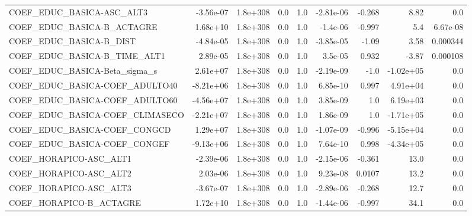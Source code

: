 \begin{tabular}{lrrrrrrrr}
COEF\_EDUC\_BASICA-ASC\_ALT3         &   -3.56e-07 &     1.8e+308 &     0.0 &      1.0 &  -2.81e-06 &      -0.268 &         8.82 &           0.0 \\
COEF\_EDUC\_BASICA-B\_ACTAGRE        &    1.68e+10 &     1.8e+308 &     0.0 &      1.0 &   -1.4e-06 &      -0.997 &          5.4 &      6.67e-08 \\
COEF\_EDUC\_BASICA-B\_DIST           &   -4.84e-05 &     1.8e+308 &     0.0 &      1.0 &  -3.85e-05 &       -1.09 &         3.58 &      0.000344 \\
COEF\_EDUC\_BASICA-B\_TIME\_ALT1      &    2.89e-05 &     1.8e+308 &     0.0 &      1.0 &    3.5e-05 &       0.932 &        -3.87 &      0.000108 \\
COEF\_EDUC\_BASICA-Beta\_sigma\_s     &    2.61e+07 &     1.8e+308 &     0.0 &      1.0 &  -2.19e-09 &        -1.0 &    -1.02e+05 &           0.0 \\
COEF\_EDUC\_BASICA-COEF\_ADULTO40    &   -8.21e+06 &     1.8e+308 &     0.0 &      1.0 &   6.85e-10 &       0.997 &     4.91e+04 &           0.0 \\
COEF\_EDUC\_BASICA-COEF\_ADULTO60    &   -4.56e+07 &     1.8e+308 &     0.0 &      1.0 &   3.85e-09 &         1.0 &     6.19e+03 &           0.0 \\
COEF\_EDUC\_BASICA-COEF\_CLIMASECO   &   -2.21e+07 &     1.8e+308 &     0.0 &      1.0 &   1.86e-09 &         1.0 &    -1.71e+05 &           0.0 \\
COEF\_EDUC\_BASICA-COEF\_CONGCD      &    1.29e+07 &     1.8e+308 &     0.0 &      1.0 &  -1.07e-09 &      -0.996 &    -5.15e+04 &           0.0 \\
COEF\_EDUC\_BASICA-COEF\_CONGEF      &   -9.13e+06 &     1.8e+308 &     0.0 &      1.0 &   7.64e-10 &       0.998 &    -4.34e+05 &           0.0 \\
COEF\_HORAPICO-ASC\_ALT1            &   -2.39e-06 &     1.8e+308 &     0.0 &      1.0 &  -2.15e-06 &      -0.361 &         13.0 &           0.0 \\
COEF\_HORAPICO-ASC\_ALT2            &    2.03e-06 &     1.8e+308 &     0.0 &      1.0 &   9.23e-08 &      0.0107 &         13.2 &           0.0 \\
COEF\_HORAPICO-ASC\_ALT3            &   -3.67e-07 &     1.8e+308 &     0.0 &      1.0 &  -2.89e-06 &      -0.268 &         12.7 &           0.0 \\
COEF\_HORAPICO-B\_ACTAGRE           &    1.72e+10 &     1.8e+308 &     0.0 &      1.0 &  -1.44e-06 &      -0.997 &         34.1 &           0.0 \\

\end{tabular}
